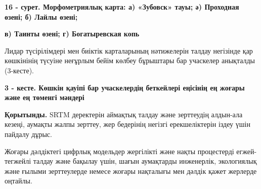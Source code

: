 
{\bfseries 16 - сурет. Морфометриялық карта: а) «Зубовск» тауы; ә)
Проходная өзені; б) Лайлы өзені;}

{\bfseries в) Таинты өзені; г) Богатыревская копь}

Лидар түсірілімдері мен биіктік карталарының нәтижелерін талдау
негізінде қар көшкінінің түсуіне неғұрлым бейім көлбеу бұрыштары бар
учаскелер анықталды (3-кесте).

{\bfseries 3 - кесте. Көшкін қауіпі бар учаскелердің беткейлері еңісінің ең
жоғары және ең төменгі мәндері}


{\bfseries Қорытынды.} SRTM деректерін аймақтық талдау және зерттеудің
алдын-ала кезеңі, аумақты жалпы зерттеу, жер бедерінің негізгі
ерекшеліктерін іздеу үшін пайдалу дұрыс.

Жоғары дәлдіктегі цифрлық модельдер жергілікті және нақты процестерді
егжей-тегжейлі талдау және бақылау үшін, шағын аумақтарды инженерлік,
экологиялық және ғылыми зерттеулерде немесе жоғары нақталығы мен дәлдік
қажет жерлерде оңтайлы.

